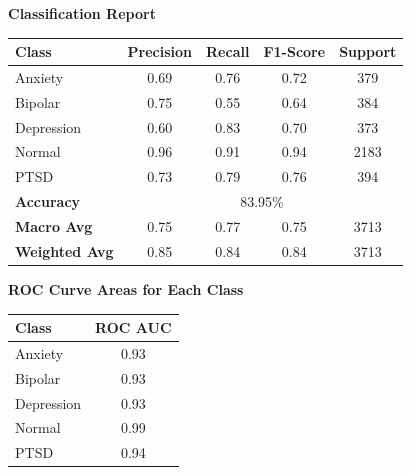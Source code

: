 \begin{center}
    \textbf{Classification Report} \\[0.5em]
    \begin{tabular}{|l|c|c|c|c|}
        \hline
        \textbf{Class} & \textbf{Precision} & \textbf{Recall} & \textbf{F1-Score} & \textbf{Support} \\ \hline
        Anxiety        & 0.69               & 0.76            & 0.72              & 379             \\ \hline
        Bipolar        & 0.75               & 0.55            & 0.64              & 384             \\ \hline
        Depression     & 0.60               & 0.83            & 0.70              & 373             \\ \hline
        Normal         & 0.96               & 0.91            & 0.94              & 2183            \\ \hline
        PTSD           & 0.73               & 0.79            & 0.76              & 394             \\ \hline
        \textbf{Accuracy} & \multicolumn{4}{|c|}{83.95\%} \\ \hline
        \textbf{Macro Avg} & 0.75            & 0.77            & 0.75              & 3713            \\ \hline
        \textbf{Weighted Avg} & 0.85         & 0.84            & 0.84              & 3713            \\ \hline
    \end{tabular}
\end{center}

\begin{center}
    \textbf{ROC Curve Areas for Each Class} \\[0.5em]
    \begin{tabular}{|l|c|}
        \hline
        \textbf{Class}  & \textbf{ROC AUC} \\ \hline
        Anxiety         & 0.93            \\ \hline
        Bipolar         & 0.93            \\ \hline
        Depression      & 0.93            \\ \hline
        Normal          & 0.99            \\ \hline
        PTSD            & 0.94            \\ \hline
    \end{tabular}
\end{center}


